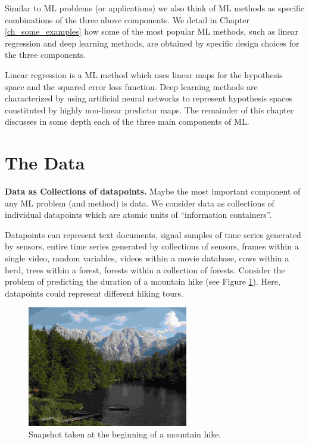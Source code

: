 \documentclass[12pt]{report}
\begin{document}
Similar to ML problems (or applications) we also think of ML 
methods as specific combinations of the three above components. 
We detail in Chapter \ref{ch_some_examples} how some of the 
most popular ML methods, such as linear regression and deep 
learning methods, are obtained by specific design choices for 
the three components. 

Linear regression is a ML method which uses linear maps for 
the hypothesis space and the squared error loss function. 
Deep learning methods are characterized by using artificial 
neural networks to represent hypothesis spaces constituted 
by highly non-linear predictor maps. The remainder of this 
chapter discusses in some depth each of the three main 
components of ML. 





\section{The Data}
\label{sec_the_data}

{\bf Data as Collections of datapoints.} Maybe the most important 
component of any ML problem (and method) is data. We consider 
data as collections of individual datapoints which are atomic units 
of ``information containers''. 

Datapoints can represent text documents, signal samples of time series 
generated by sensors, entire time series generated by collections of sensors, 
frames within a single video, random variables, videos within a movie database, 
cows within a herd, trees within a forest, forests within a collection of forests. 
Consider the problem of predicting the duration of a mountain hike (see Figure \ref{fig:image}). 
Here, datapoints could represent different hiking tours.  

\begin{figure}[htbp]
	\centering
	\includegraphics[width=7cm]{BergSee1.jpg}
	\caption{Snapshot taken at the beginning of a mountain hike.}
	\label{fig:image}
\end{figure}
\end{document}
